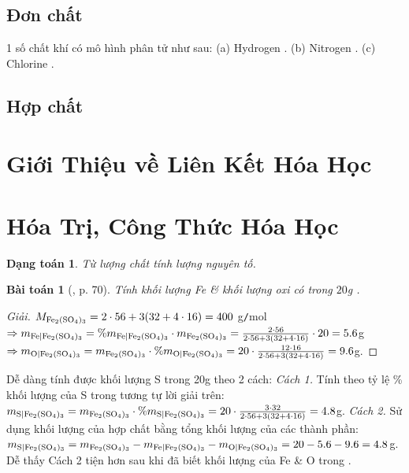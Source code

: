\documentclass{article}
\newtheorem{baitoan}{Bài toán}
\newtheorem{dangtoan}{Dạng toán}
\begin{document}
\subsection{Đơn chất}
1 số chất khí có mô hình phân tử như sau: (a) Hydrogen . (b) Nitrogen . (c) Chlorine .

\subsection{Hợp chất}


\section{Giới Thiệu về Liên Kết Hóa Học}


\section{Hóa Trị, Công Thức Hóa Học}

\begin{dangtoan}
	Từ lượng chất tính lượng nguyên tố.
\end{dangtoan}

\begin{baitoan}[\cite{Tuan2022}, p. 70]
	Tính khối lượng \emph{Fe} \& khối lượng oxi có trong $20$\emph{g} \emph{}.
\end{baitoan}

\begin{proof}[Giải]
	$M_{\ce{Fe2(SO4)3}} = 2\cdot56 + 3(32 + 4\cdot16) = 400$ g\texttt{/}mol$\Rightarrow m_{\ce{Fe|Fe2(SO4)3}} = \%m_{\ce{Fe|Fe2(SO4)3}}\cdot m_{\ce{Fe2(SO4)3}} = \frac{2\cdot56}{2\cdot56 + 3(32 + 4\cdot16)}\cdot20 = 5.6$g$\Rightarrow m_{\ce{O|Fe2(SO4)3}} = m_{\ce{Fe2(SO4)3}}\cdot\%m_{\ce{O|Fe2(SO4)3}} = 20\cdot\frac{12\cdot16}{2\cdot56 + 3(32 + 4\cdot16)} = 9.6$g.
\end{proof}
Dễ dàng tính được khối lượng S trong 20g  theo 2 cách: \textit{Cách 1.} Tính theo tỷ lệ \% khối lượng của S trong  tương tự lời giải trên: $m_{\ce{S|Fe2(SO4)3}} = m_{\ce{Fe2(SO4)3}}\cdot\%m_{\ce{S|Fe2(SO4)3}} = 20\cdot\frac{3\cdot32}{2\cdot56 + 3(32 + 4\cdot16)} = 4.8$g. \textit{Cách 2.} Sử dụng khối lượng của hợp chất bằng tổng khối lượng của các thành phần: $m_{\ce{S|Fe2(SO4)3}} = m_{\ce{Fe2(SO4)3}} - m_{\ce{Fe|Fe2(SO4)3}} - m_{\ce{O|Fe2(SO4)3}} = 20 - 5.6 - 9.6 = 4.8$g. Dễ thấy Cách 2 tiện hơn sau khi đã biết khối lượng của Fe \& O trong .
\end{document}
